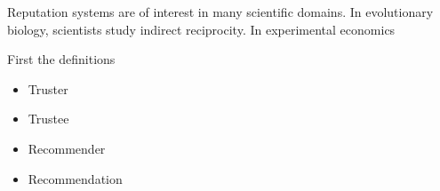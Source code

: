 
Reputation systems are of interest in many scientific domains.
In evolutionary biology, scientists study indirect reciprocity\cite{nowak2005evolution}.
In experimental economics

First the definitions
\begin{itemize}
  \item Truster
  \item Trustee
  \item Recommender
  \item Recommendation
\end{itemize}


